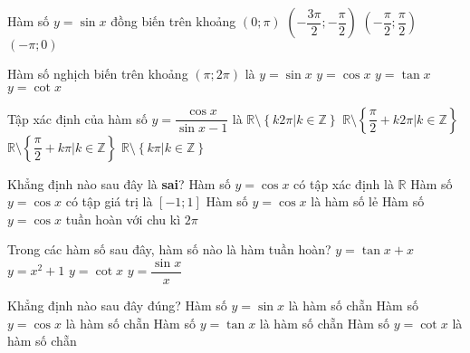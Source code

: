 \begin{ex}%
	Hàm số $y=\sin x$ đồng biến trên khoảng
	\choice
	{$(0 ; \pi)$}
	{$\left(-\dfrac{3 \pi}{2} ;-\dfrac{\pi}{2}\right)$}
	{\True $\left(-\dfrac{ \pi}{2} ;\dfrac{\pi}{2}\right)$}
	{$(-\pi ; 0)$}
\end{ex}

\begin{ex}%
	Hàm số nghịch biến trên khoảng $(\pi ; 2 \pi)$ là
	\choice
	{$y=\sin x$}
	{$y=\cos x$}
	{$y=\tan x$}
	{\True $y=\cot x$}
\end{ex}
\begin{ex}%
	Tập xác định của hàm số $y=\dfrac{\cos x}{\sin x-1}$ là
	\choice
	{$\mathbb{R}\setminus \left\{k2\pi| k\in\mathbb{Z}\right\}$}
	{\True $\mathbb{R}\setminus \left\{\dfrac{\pi}{2}+k2\pi| k\in\mathbb{Z}\right\}$}
	{$\mathbb{R}\setminus \left\{\dfrac{\pi}{2}+k\pi| k\in\mathbb{Z}\right\}$}
	{$\mathbb{R}\setminus \left\{k\pi| k\in\mathbb{Z}\right\}$}
\end{ex}
\begin{ex}%
	Khẳng định nào sau đây là \textbf{sai}?
	\choice
	{Hàm số $y=\cos x$ có tập xác định là $\mathbb{R}$}
	{Hàm số $y=\cos x$ có tập giá trị là $[-1;1]$}
	{\True Hàm số $y=\cos x$ là hàm số lẻ}
	{Hàm số $y=\cos x$ tuần hoàn với chu kì $2\pi$}
\end{ex}
\begin{ex}%
	Trong các hàm số sau đây, hàm số nào là hàm tuần hoàn?
	\choice
	{$y=\tan x+x$}
	{$y=x^2+1$}
	{\True $y=\cot x$}
	{$y=\dfrac{\sin x}{x}$}
\end{ex}
\begin{ex}%
	Khẳng định nào sau đây đúng?
	\choice
	{Hàm số $y=\sin x$ là hàm số chẵn}
	{\True Hàm số $y=\cos x$ là hàm số chẵn}
	{Hàm số $y=\tan x$ là hàm số chẵn}
	{Hàm số $y=\cot x$ là hàm số chẵn}
\end{ex}

